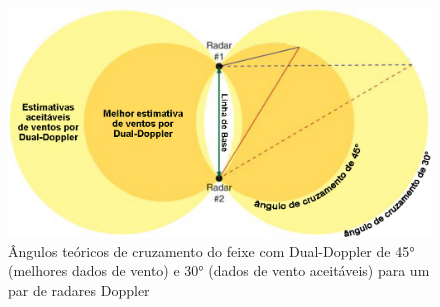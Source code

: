 \begin{figure}[htb]
	\begin{center}
		\caption{Ângulos teóricos de cruzamento do feixe com Dual-Doppler de \ang{45} (melhores dados de vento) e \ang{30} (dados de vento aceitáveis) para um par de radares Doppler} 
		\label{doppler_theory_lobes}
		\includegraphics[width=\columnwidth]{figs/lobes_eastin_ptbr.png}
	\end{center}
\end{figure}

